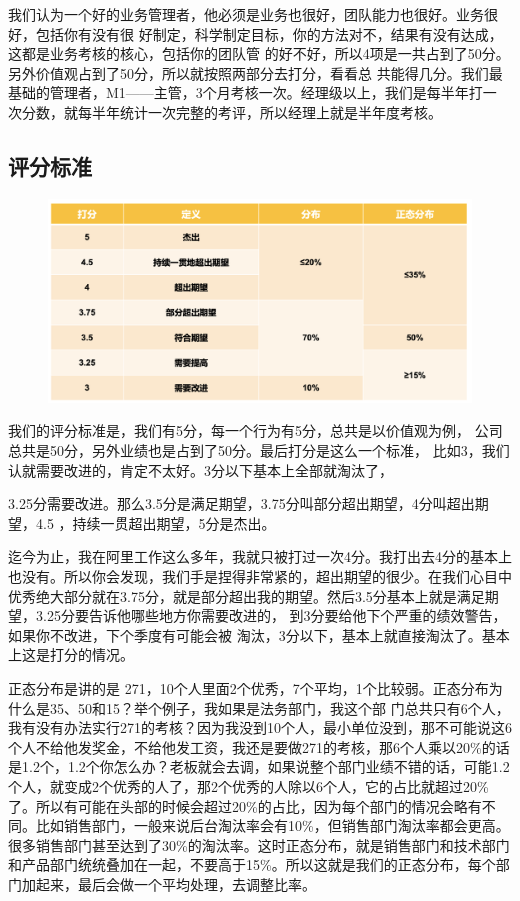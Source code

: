 \documentclass[12pt]{article}
\begin{document}
我们认为一个好的业务管理者，他必须是业务也很好，团队能力也很好。业务很好，包括你有没有很 好制定，科学制定目标，你的方法对不，结果有没有达成，这都是业务考核的核心，包括你的团队管 的好不好，所以4项是一共占到了50分。另外价值观占到了50分，所以就按照两部分去打分，看看总 共能得几分。我们最基础的管理者，M1——主管，3个月考核一次。经理级以上，我们是每半年打一 次分数，就每半年统计一次完整的考评，所以经理上就是半年度考核。

\subsection{评分标准}
\begin{figure}[H]
    \centering
    \includegraphics[width=1\textwidth]{fig/Ali_Performance_9.png}
\end{figure}
我们的评分标准是，我们有5分，每一个行为有5分，总共是以价值观为例， 公司总共是50分，另外业绩也是占到了50分。最后打分是这么一个标准， 比如3，我们认就需要改进的，肯定不太好。3分以下基本上全部就淘汰了，

3.25分需要改进。那么3.5分是满足期望，3.75分叫部分超出期望，4分叫超出期望，4.5 ，持续一贯超出期望，5分是杰出。

迄今为止，我在阿里工作这么多年，我就只被打过一次4分。我打出去4分的基本上也没有。所以你会发现，我们手是捏得非常紧的，超出期望的很少。在我们心目中优秀绝大部分就在3.75分，就是部分超出我的期望。然后3.5分基本上就是满足期望，3.25分要告诉他哪些地方你需要改进的， 到3分要给他下个严重的绩效警告，如果你不改进，下个季度有可能会被 淘汰，3分以下，基本上就直接淘汰了。基本上这是打分的情况。

正态分布是讲的是 271，10个人里面2个优秀，7个平均，1个比较弱。正态分布为什么是35、50和15？举个例子，我如果是法务部门，我这个部 门总共只有6个人，我有没有办法实行271的考核？因为我没到10个人，最小单位没到，那不可能说这6个人不给他发奖金，不给他发工资，我还是要做271的考核，那6个人乘以20\%的话是1.2个，1.2个你怎么办？老板就会去调，如果说整个部门业绩不错的话，可能1.2个人，就变成2个优秀的人了，那2个优秀的人除以6个人，它的占比就超过20\%了。所以有可能在头部的时候会超过20\%的占比，因为每个部门的情况会略有不同。比如销售部门，一般来说后台淘汰率会有10\%，但销售部门淘汰率都会更高。 很多销售部门甚至达到了30\%的淘汰率。这时正态分布，就是销售部门和技术部门和产品部门统统叠加在一起，不要高于15\%。所以这就是我们的正态分布，每个部门加起来，最后会做一个平均处理，去调整比率。
\end{document}
